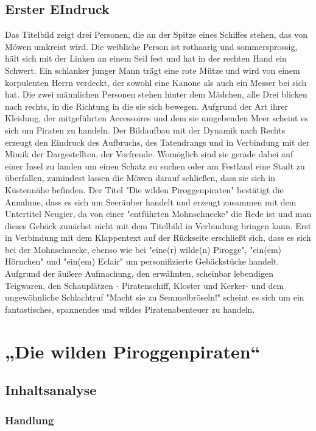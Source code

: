 \section{Erster EIndruck}
Das Titelbild zeigt drei Personen, die an der Spitze eines Schiffes stehen, das von Möwen umkreist wird. Die weibliche Person ist rothaarig und sommersprossig, hält sich mit der Linken an einem Seil fest und hat in der rechten Hand ein Schwert. Ein schlanker junger Mann trägt eine rote Mütze und wird von einem korpulenten Herrn verdeckt, der sowohl eine Kanone als auch ein Messer bei sich hat. Die zwei männlichen Personen stehen hinter dem Mädchen, alle Drei blicken nach rechts, in die Richtung in die sie sich bewegen. Aufgrund der Art ihrer Kleidung, der mitgeführten Accessoires und dem sie umgebenden Meer scheint es sich um Piraten zu handeln. Der Bildaufbau mit der Dynamik nach Rechts erzeugt den Eindruck des Aufbruchs, des Tatendrangs und in Verbindung mit der Mimik der Dargestellten, der Vorfreude. Womöglich sind sie gerade dabei auf einer Insel zu landen um einen Schatz zu suchen oder am Festland eine Stadt zu überfallen, zumindest lassen die Möwen darauf schließen, dass sie sich in Küstennähe befinden.
Der Titel "Die wilden Piroggenpiraten" bestätigt die Annahme, dass es sich um Seeräuber handelt und erzeugt zusammen mit dem Untertitel Neugier, da von einer "entführten Mohnschnecke" die Rede ist und man dieses Gebäck zunächst nicht mit dem Titelbild in Verbindung bringen kann. Erst in Verbindung mit dem Klappentext auf der Rückseite erschließt sich, dass es sich bei der Mohnschnecke, ebenso wie bei "eine(r) wilde(n) Pirogge", "ein(em) Hörnchen" und "ein(em) Eclair" um personifizierte Gebäckstücke handelt. Aufgrund der äußere Aufmachung, den erwähnten, scheinbar lebendigen Teigwaren, den Schauplätzen - Piratenschiff, Kloster und Kerker- und dem ungewöhnliche Schlachtruf "Macht sie zu Semmelbröseln!" scheint es sich um ein fantastisches, spannendes und wildes Piratenabenteuer zu handeln.

\chapter{„Die wilden Piroggenpiraten“}

\section{Inhaltsanalyse}

\subsection{Handlung}

